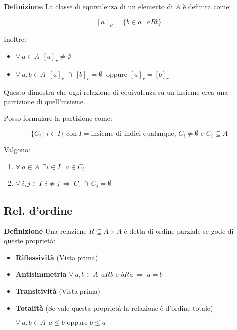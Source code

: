 \documentclass{article}
\begin{document}
\noindent\textbf{Definizione} La classe di equivalenza di un elemento di $A$ è definita come:

$$[a]_R=\{b\in a\ |\ aRb\}$$

\noindent Inoltre:
\begin{itemize}
    \item $\forall\ a\in A\ \ [a]_r\neq \emptyset$
    \item $\forall\ a,b\in A \ \ [a]_r\ \cap\ [b]_r = \emptyset\ \text{ oppure } [a]_r=[b]_r $
\end{itemize}

\noindent Questo dimostra che ogni relazione di equivalenza su un insieme crea una partizione di quell'insieme.\newline

\newpage

\noindent Posso formulare la partizione come:

$$\{C_i\ |\ i\in I\} \text{ con } I= \text{insieme di indici qualunque, } C_i\neq\emptyset \text{ e } C_i\subseteq A$$

\vspace{2pt}

\noindent Valgono:
\begin{enumerate}
    \item $\forall\ a\in A \ \ \exists i\in I\ |\ a\in C_i$
    \item $\forall \ i,j\in I\ \ i\neq j\ \Rightarrow\ C_i\ \cap\ C_j = \emptyset $
\end{enumerate}

\subsection{Rel. d'ordine}

\textbf{Definizione} Una relazione $R\subseteq A\times A$ è detta di ordine parziale se gode di queste proprietà:
\begin{itemize}
    \item \textbf{Riflessività} (Vista prima)
    \item \textbf{Antisimmetria} $\forall\ a,b\in A\ \ aRb  \text{ e } bRa\ \Rightarrow\ a=b$
    \item \textbf{Transitività} (Vista prima)
    \item \textbf{Totalità} (Se vale questa proprietà la relazione è d'ordine totale) 
    
    $\forall\ a,b\in A\ \ a\leq b \text{ oppure } b\leq a$\newline
\end{itemize}
\end{document}
